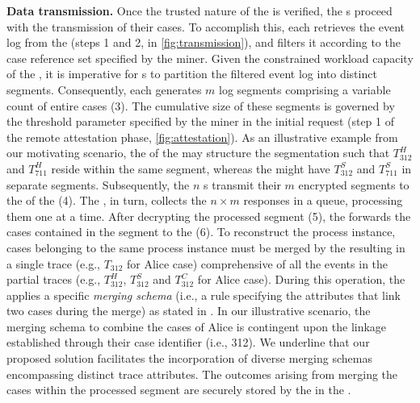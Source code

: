 \noindent\textbf{Data transmission.} Once the trusted nature of the  is verified, the s proceed with the transmission of their cases. To accomplish this, each  retrieves the event log from the  (steps 1 and 2, in \cref{fig:transmission}), and filters it according to the case reference set specified by the miner. Given the constrained workload capacity of the , it is imperative for s to partition the filtered event log into distinct segments. %
Consequently, each  generates $m$ log segments comprising a variable count of entire cases (3). The cumulative size of these segments is governed by the threshold parameter specified by the miner in the initial request (step 1 of the remote attestation phase, \cref{fig:attestation}). As an illustrative example from our motivating scenario, the  of the  may structure the segmentation such that $T^H_{312}$ and $T^H_{711}$ reside within the same segment, whereas the  might have $T^S_{312}$ and $T^S_{711}$ in separate segments. Subsequently, the $n$ s transmit their $m$ encrypted segments to the  of the  (4). The , in turn, collects the $n \times m$ responses in a queue, processing them one at a time. After decrypting the processed segment (5), the  forwards the cases contained in the segment to the  (6). To reconstruct the process instance, cases belonging to the same process instance must be merged by the  resulting in a single trace (e.g., $T_{312}$ for Alice case) comprehensive of all the events in the partial traces (e.g., $T^H_{312}$, $T^S_{312}$ and $T^C_{312}$ for Alice case). During this operation, the  applies a specific \textit{merging schema} (i.e., a rule specifying the attributes that link two cases during the merge) as stated in \cite{claes2014merging}. In our illustrative scenario, the merging schema to combine the cases of Alice is contingent upon the linkage established through their case identifier (i.e., 312). We underline that our proposed solution facilitates the incorporation of diverse merging schemas encompassing distinct trace attributes. The outcomes arising from merging the cases within the processed segment are securely stored by the  in the .

